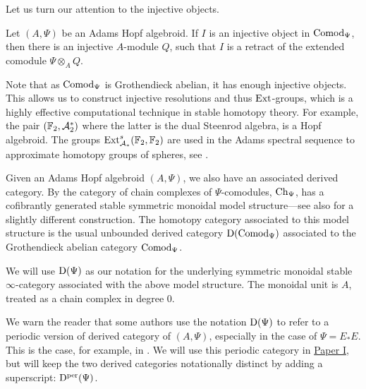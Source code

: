 Let us turn our attention to the injective objects. 

\begin{proposition}
    \label{ch0:rm:injective-comodules}
    Let $(A, \Psi)$ be an Adams Hopf algebroid. If $I$ is an injective object in $\mathrm{Comod}_\Psi$, then there is an injective $A$-module $Q$, such that $I$ is a retract of the extended comodule $\Psi\otimes_A Q$. 
\end{proposition}

\begin{remark}
    Note that as $\mathrm{Comod}_{\Psi}$ is Grothendieck abelian, it has enough injective objects. This allows us to construct injective resolutions and thus $\operatorname{Ext}$-groups, which is a highly effective computational technique in stable homotopy theory. For example, the pair $(\mathbb{F}_2, \mathcal{A}_2^*)$ where the latter is the dual Steenrod algebra, is a Hopf algebroid. The groups $\operatorname{Ext}^s_{\mathcal{A}_*}(\mathbb{F}_2, \mathbb{F}_2)$ are used in the Adams spectral sequence to approximate homotopy groups of spheres, see \cite{adams_58}. 
\end{remark}

Given an Adams Hopf algebroid $(A, \Psi)$, we also have an associated derived category. By \cite[2.1.2, 2.1.3]{hovey_04} the category of chain complexes of $\Psi$-comodules, $\mathrm{Ch}_\Psi$, has a cofibrantly generated stable symmetric monoidal model structure---see also \cite{barnes-roitzheim_2011} for a slightly different construction. The homotopy category associated to this model structure is the usual unbounded derived category $\mathrm{D}(\mathrm{Comod}_\Psi)$ associated to the Grothendieck abelian category $\mathrm{Comod}_\Psi$. 

\begin{notation}
    We will use $\mathrm{D}(\Psi)$ as our notation for the underlying symmetric monoidal stable $\infty$-category associated with the above model structure. The monoidal unit is $A$, treated as a chain complex in degree $0$.
\end{notation}

\begin{remark}
    We warn the reader that some authors use the notation $\mathrm{D}(\Psi)$ to refer to a periodic version of derived category of $(A, \Psi)$, especially in the case of $\Psi = E_*E$. This is the case, for example, in \cite{pstragowski_2021}. We will use this periodic category in \hyperref[ch1]{Paper I}, but will keep the two derived categories notationally distinct by adding a superscript: $\mathrm{D}^{\mathrm{per}}(\Psi)$. 
\end{remark}


